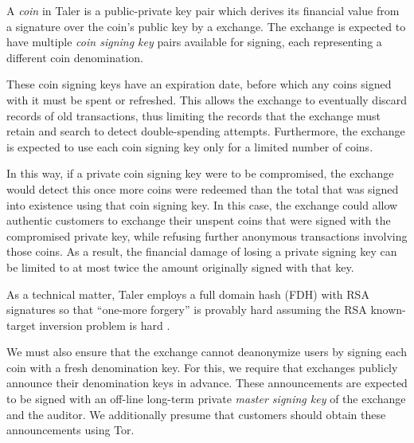 \documentclass{llncs}
\begin{document}
A \emph{coin} in Taler is a public-private key pair which derives its
financial value from a signature over the coin's public key by a exchange.
The exchange is expected to have multiple {\em coin signing key} pairs
available for signing, each representing a different coin
denomination.

These coin signing keys have an expiration date, before which any coins
signed with it must be spent or refreshed.  This allows the exchange to
eventually discard records of old transactions, thus limiting the
records that the exchange must retain and search to detect double-spending
attempts.  Furthermore, the exchange is expected to use each coin signing
key only for a limited number of coins.

In this way, if a private coin signing key were to be compromised,
the exchange would detect this once more coins were redeemed than the total
that was signed into existence using that coin signing key.
In this case, the exchange could allow authentic customers to exchange their
unspent coins that were signed with the compromised private key,
while refusing further anonymous transactions involving those coins.
As a result, the financial damage of losing a private signing key can be
limited to at most twice the amount originally signed with that key.

As a technical matter, Taler employs a full domain hash (FDH) with
RSA signatures so that ``one-more forgery'' is provably hard assuming the
RSA known-target inversion problem is hard \cite[Theorem 12]{RSA-HDF-KTIvCTI}.

We must also ensure that the exchange cannot deanonymize users by 
signing each coin with a fresh denomination key.  For this, we require
that exchanges publicly announce their denomination keys in advance.  
These announcements are expected to be signed with an off-line
long-term private {\em master signing key} of the exchange and the
auditor.  We additionally presume that customers should obtain these
announcements using Tor. 
\end{document}
